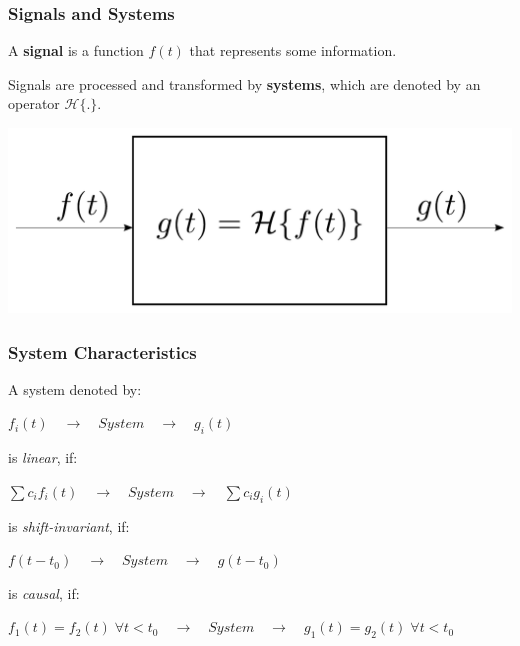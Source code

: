 \begin{frame}
    \frametitle{Signals and Systems}
    \begin{myDefinition}
        A \textbf{signal} is a function $f(t)$ that represents some information.

        \vspace{5mm}

        Signals are processed and transformed by \textbf{systems}, which are denoted by an operator $\mathcal{H}\{.\}$.
    \end{myDefinition}
    \begin{center}
        \includegraphics[height=.30\textheight ]{images/SystemBlock.pdf}
    \end{center}

\end{frame}

\begin{frame}
    \frametitle{System Characteristics}

    \begin{myDefinition}
        A system denoted by:
        \begin{center}
            $f_i(t) \quad \rightarrow \quad System \quad \rightarrow \quad g_i(t)$
        \end{center}
        is \textit{linear}, if:
        \begin{center}
            ${\sum c_if_i(t)} \quad \rightarrow \quad System \quad \rightarrow \quad {\sum c_ig_i(t)}$
        \end{center}
        is \textit{shift-invariant}, if:
        \begin{center}
            $f(t-t_0) \quad \rightarrow \quad System \quad \rightarrow \quad g(t-t_0)$
        \end{center}
        is \textit{causal}, if:
        \begin{center}
            $f_1(t) = f_2(t) \; \forall t < t_0 \quad \rightarrow \quad System \quad \rightarrow \quad g_1(t) = g_2(t) \; \forall t < t_0$
        \end{center}
    \end{myDefinition}
\end{frame}


